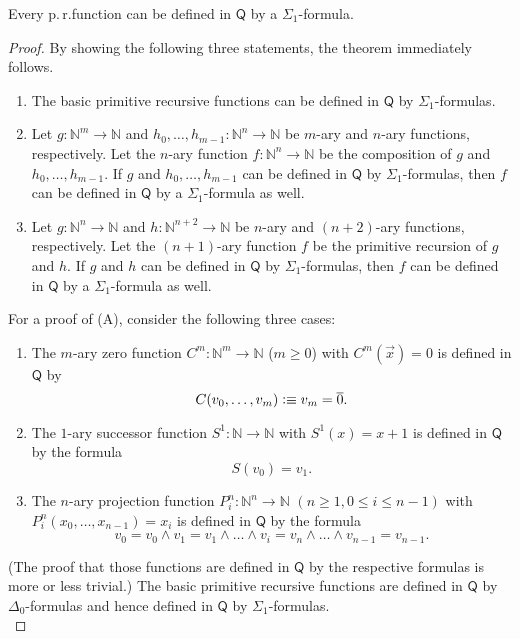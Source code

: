 \begin{thm}\label{thm:arithmeticQdefined}
Every p.\,r.\@ function can be defined in $\mathsf{Q}$ by a $\Sigma_1$-formula.
\end{thm}
\begin{proof}
By showing the following three statements, the theorem immediately follows.

\begin{enumerate}[label=\Alph*]
\item The basic primitive recursive functions can be defined in $\mathsf{Q}$ by $\Sigma_1$-formulas.
\item Let $g : \mathbb{N}^m \rightarrow \mathbb{N}$ and $h_0, \ldots, h_{m-1} : \mathbb{N}^n \rightarrow \mathbb{N}$ be $m$-ary and $n$-ary functions, respectively. Let the $n$-ary function $f: \mathbb{N}^n \rightarrow \mathbb{N}$ be the composition of $g$ and $h_0, \ldots, h_{m-1}$. If $g$ and $h_0, \ldots, h_{m-1}$ can be defined in $\mathsf{Q}$ by $\Sigma_1$-formulas, then $f$ can be defined in $\mathsf{Q}$ by a $\Sigma_1$-formula as well.
\item Let $g : \mathbb{N}^n \rightarrow \mathbb{N}$ and $h : \mathbb{N}^{n+2} \rightarrow \mathbb{N}$ be $n$-ary and $(n+2)$-ary functions, respectively. Let the $(n+1)$-ary function $f$ be the primitive recursion of $g$ and $h$. If $g$ and $h$ can be defined in $\mathsf{Q}$ by $\Sigma_1$-formulas, then $f$ can be defined in $\mathsf{Q}$ by a $\Sigma_1$-formula as well.
\end{enumerate}

For a proof of (A), consider the following three cases:
\begin{enumerate}
\item The $m$-ary zero function $C^m: \mathbb{N}^m \rightarrow \mathbb{N}$ ($m \ge 0$) with $C^m(\overrightarrow{x}) = 0$ is defined in $\mathsf{Q}$ by \[C(v_0, \ldots, v_{m}) \vcentcolon \equiv v_{m} = \overline{0}.\] 
\item The $1$-ary successor function $S^1: \mathbb{N} \rightarrow \mathbb{N}$ with $S^1(x) = x + 1$ is defined in $\mathsf{Q}$ by the formula \[S(v_0)=v_1.\]
\item The $n$-ary projection function $P_i^n:\mathbb{N}^n \rightarrow \mathbb{N}$ $(n \ge 1, 0 \le i \le n-1)$ with $P_i^n(x_0,\ldots, x_{n-1}) = x_i $ is defined in $\mathsf{Q}$ by the formula \[v_0 = v_0  \wedge  v_{1} = v_{1}  \wedge  \ldots  \wedge  v_{i} = v_{n}  \wedge  \ldots  \wedge  v_{n-1} = v_{n-1}.\]
\end{enumerate}
(The proof that those functions are defined in $\mathsf{Q}$ by the respective formulas is more or less trivial.) The basic primitive recursive functions are defined in $\mathsf{Q}$ by $\Delta_0$-formulas and hence defined in $\mathsf{Q}$ by $\Sigma_1$-formulas.
\\


\end{proof}
